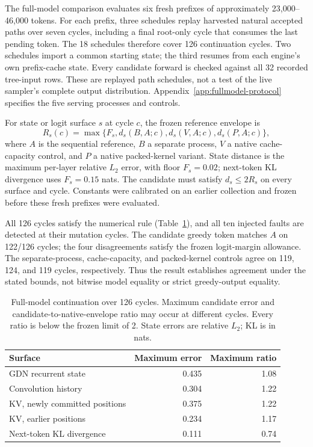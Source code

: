 The full-model comparison evaluates six fresh prefixes of approximately 23,000--46,000 tokens. For each prefix, three schedules replay harvested natural accepted paths over seven cycles, including a final root-only cycle that consumes the last pending token. The 18 schedules therefore cover 126 continuation cycles. Two schedules import a common starting state; the third resumes from each engine's own prefix-cache state. Every candidate forward is checked against all 32 recorded tree-input rows. These are replayed path schedules, not a test of the live sampler's complete output distribution. Appendix~\ref{app:fullmodel-protocol} specifies the five serving processes and controls.

For state or logit surface $s$ at cycle $c$, the frozen reference envelope is
\begin{equation}
 R_s(c)=\max\{F_s,d_s(B,A;c),d_s(V,A;c),d_s(P,A;c)\},
\end{equation}
where $A$ is the sequential reference, $B$ a separate process, $V$ a native cache-capacity control, and $P$ a native packed-kernel variant. State distance is the maximum per-layer relative $L_2$ error, with floor $F_s=0.02$; next-token KL divergence uses $F_s=0.15$ nats. The candidate must satisfy $d_s\leq2R_s$ on every surface and cycle. Constants were calibrated on an earlier collection and frozen before these fresh prefixes were evaluated.

All 126 cycles satisfy the numerical rule (Table~\ref{tab:fullmodel-agreement}), and all ten injected faults are detected at their mutation cycles. The candidate greedy token matches $A$ on 122/126 cycles; the four disagreements satisfy the frozen logit-margin allowance. The separate-process, cache-capacity, and packed-kernel controls agree on 119, 124, and 119 cycles, respectively. Thus the result establishes agreement under the stated bounds, not bitwise model equality or strict greedy-output equality.

\begin{table}[t]
\caption{Full-model continuation over 126 cycles. Maximum candidate error and candidate-to-native-envelope ratio may occur at different cycles. Every ratio is below the frozen limit of 2. State errors are relative $L_2$; KL is in nats.}
\label{tab:fullmodel-agreement}
\centering\small
\setlength{\tabcolsep}{4pt}
\begin{tabular}{@{}lrr@{}}
\toprule
Surface & Maximum error & Maximum ratio \\
\midrule
GDN recurrent state & 0.435 & 1.08 \\
Convolution history & 0.304 & 1.22 \\
KV, newly committed positions & 0.375 & 1.22 \\
KV, earlier positions & 0.234 & 1.17 \\
Next-token KL divergence & 0.111 & 0.74 \\
\bottomrule
\end{tabular}
\end{table}

